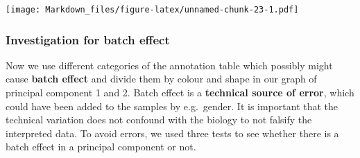 \documentclass[]{article}
\begin{document}
\texttt{[image: Markdown\_files/figure-latex/unnamed-chunk-23-1.pdf]}

\subsubsection{Investigation for batch
effect}\label{investigation-for-batch-effect}

Now we use different categories of the annotation table which possibly
might cause \textbf{batch effect} and divide them by colour and shape in
our graph of principal component 1 and 2. Batch effect is a
\textbf{technical source of error}, which could have been added to the
samples by e.g.~gender. It is important that the technical variation
does not confound with the biology to not falsify the interpreted data.
To avoid errors, we used three tests to see whether there is a batch
effect in a principal component or not.
\end{document}
